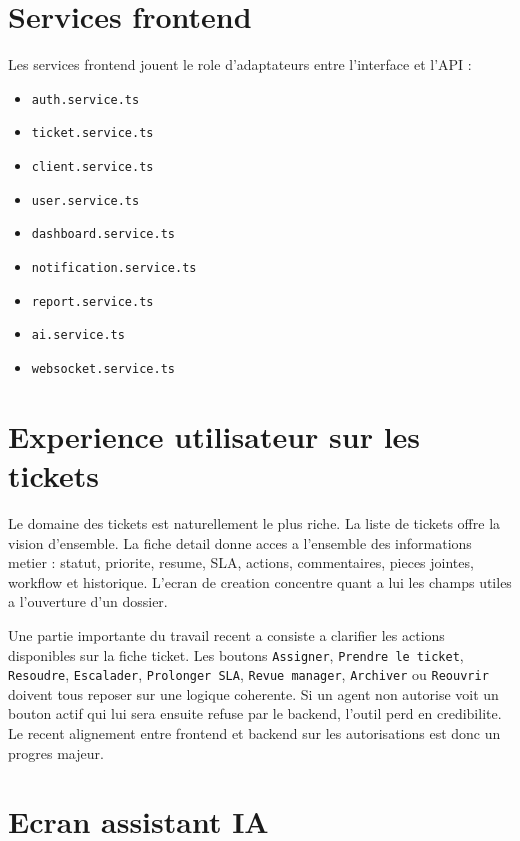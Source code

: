 \section{Services frontend}

Les services frontend jouent le role d'adaptateurs entre l'interface et l'API :

\begin{itemize}[leftmargin=1.2cm]
  \item \texttt{auth.service.ts}
  \item \texttt{ticket.service.ts}
  \item \texttt{client.service.ts}
  \item \texttt{user.service.ts}
  \item \texttt{dashboard.service.ts}
  \item \texttt{notification.service.ts}
  \item \texttt{report.service.ts}
  \item \texttt{ai.service.ts}
  \item \texttt{websocket.service.ts}
\end{itemize}

\section{Experience utilisateur sur les tickets}

Le domaine des tickets est naturellement le plus riche. La liste de tickets offre la vision d'ensemble. La fiche detail donne acces a l'ensemble des informations metier : statut, priorite, resume, SLA, actions, commentaires, pieces jointes, workflow et historique. L'ecran de creation concentre quant a lui les champs utiles a l'ouverture d'un dossier.

Une partie importante du travail recent a consiste a clarifier les actions disponibles sur la fiche ticket. Les boutons \texttt{Assigner}, \texttt{Prendre le ticket}, \texttt{Resoudre}, \texttt{Escalader}, \texttt{Prolonger SLA}, \texttt{Revue manager}, \texttt{Archiver} ou \texttt{Reouvrir} doivent tous reposer sur une logique coherente. Si un agent non autorise voit un bouton actif qui lui sera ensuite refuse par le backend, l'outil perd en credibilite. Le recent alignement entre frontend et backend sur les autorisations est donc un progres majeur.

\section{Ecran assistant IA}

